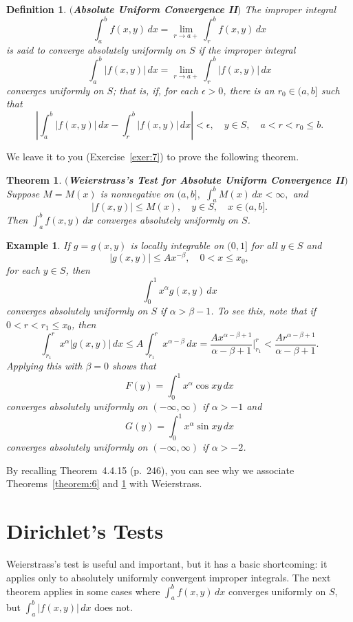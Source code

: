 \documentclass{article}
\newtheorem{definition}{Definition}
\newtheorem{theorem}{Theorem}
\newtheorem{example}{Example}
\begin{document}
\begin{definition}{\bf$($Absolute Uniform Convergence II$)$}
\label{definition:5}
The improper integral
$$
\int_{a}^{b}f(x,y)\,dx=\lim_{r\to a+}\int_{r}^{b}f(x,y)\,dx
$$
is said to converge absolutely  uniformly on $S$ if the improper
integral
$$
\int_{a}^{b}|f(x,y)|\,dx=\lim_{r\to a+}\int_{r}^{b}|f(x,y)|\,dx
$$
converges uniformly on $S$; that is,
 if, for each $\epsilon>0$,
there is an $r_{0}\in (a,b]$  such that
$$
\left|\int_{a}^{b}|f(x,y)|\,dx-\int_{r}^{b}|f(x,y)|\,dx\right|
<\epsilon, \quad y\in S, \quad   a<r<r_{0}\le b.
$$
\end{definition}



We leave it to you (Exercise~\ref{exer:7}) to prove the following theorem.


\begin{theorem}  \label{theorem:7}
{\bf$($Weierstrass's Test for Absolute Uniform Convergence II$)$}
Suppose $M=M(x)$ is nonnegative on $(a,b],$ $\int_{a}^{b}M(x)\,dx<\infty,$
 and
$$
|f(x,y)| \le M(x), \quad  y\in S, \quad  x\in (a,b].
$$
Then $\int_{a}^{b}f(x,y)\,dx$    converges absolutely uniformly on $S$.
\end{theorem}



\begin{example}  \label{example:8}  \rm
If $g=g(x,y)$ is locally integrable on $(0,1]$ for all $y\in S$
and
$$
|g(x,y)| \le Ax^{-\beta}, \quad 0<x \le x_{0},
$$
for each $y \in S$, then
$$
\int_{0}^{1} x^{\alpha}g(x,y)\,dx
$$
converges absolutely uniformly on $S$  if $\alpha>\beta-1$. To
 see this, note that if $0<r< r_{1}\le x_{0}$, then
$$
\int_{r_{1}}^{r}x^{\alpha}|g(x,y)|\,dx \le A\int_{r_{1}}^{r}
x^{\alpha-\beta}\,dx=
\frac{Ax^{\alpha-\beta+1}}{\alpha-\beta+1}\biggr|_{r_{1}}^{r}<
\frac{Ar^{\alpha-\beta+1}}{\alpha-\beta+1}.
$$
Applying this with $\beta=0$ shows that
$$
F(y)=\int_{0}^{1} x^{\alpha}\cos xy\,dx
$$
converges absolutely uniformly on $(-\infty,\infty)$ if $\alpha>-1$
and
$$
G(y)=\int_{0}^{1}x^{\alpha}\sin xy \,dx
$$
converges absolutely uniformly on $(-\infty,\infty)$  if
$\alpha>-2$.
\end{example}


By recalling Theorem~4.4.15 (p.~246),
you can see why   we associate  Theorems~\ref{theorem:6}  and
\ref{theorem:7}
 with Weierstrass.

\section{Dirichlet's Tests} \label{section:dirichlet}
 Weierstrass's test is useful and important, but  it has a basic
shortcoming:
it applies only to absolutely uniformly convergent improper integrals.
 The next theorem applies in some cases
where $\int_{a}^{b}f(x,y)\,dx$   converges uniformly on  $S$,
but
$\int_{a}^{b}|f(x,y)|\,dx$  does not.
\end{document}

